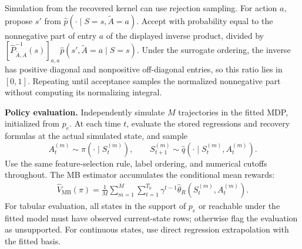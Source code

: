 \documentclass[12pt]{article}
\newcommand{\0}{\boldsymbol{0}}
\begin{document}
Simulation from the recovered kernel can use rejection sampling. For action $a$, propose $s'$ from $\widehat p(\cdot\mid S=s,\widetilde A=a)$. Accept with probability equal to the nonnegative part of entry $a$ of the displayed inverse product, divided by $[\widehat P_{\widetilde A,A}^{-1}(s)]_{a,a}\widehat p(s',\widetilde A=a\mid S=s)$. Under the surrogate ordering, the inverse has positive diagonal and nonpositive off-diagonal entries, so this ratio lies in $[0,1]$. Repeating until acceptance samples the normalized nonnegative part without computing its normalizing integral.

\textbf{Policy evaluation.}
Independently simulate $M$ trajectories in the fitted MDP, initialized from $p_e$. At each time $t$, evaluate the stored regressions and recovery formulas at the actual simulated state, and sample
\[
A_t^{(m)}\sim\pi(\cdot\mid S_t^{(m)}),\qquad
S_{t+1}^{(m)}\sim\widehat q(\cdot\mid S_t^{(m)},A_t^{(m)}).
\]
Use the same feature-selection rule, label ordering, and numerical cutoffs throughout. The MB estimator accumulates the conditional mean rewards:
\begin{gather}\label{eq:model_based_benchmark}
\widehat V_{\mathrm{MB}}(\pi)
=\frac{1}{M}\sum_{m=1}^M\sum_{t=1}^{T_0}
\gamma^{t-1}\widehat\theta_R(S_t^{(m)},A_t^{(m)}).
\end{gather}
For tabular evaluation, all states in the support of $p_e$ or reachable under the fitted model must have observed current-state rows; otherwise flag the evaluation as unsupported. For continuous states, use direct regression extrapolation with the fitted basis.
\end{document}
